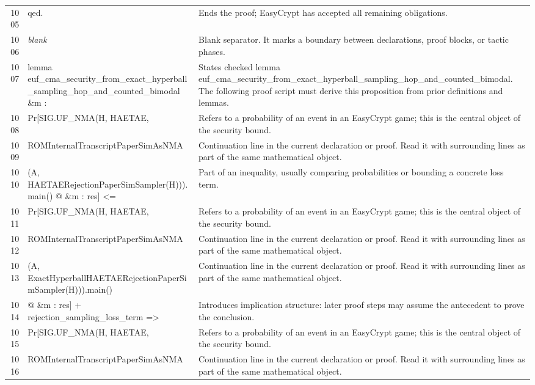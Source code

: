 \documentclass[10pt]{article}
\begin{document}
\begin{longtable}{r L{0.53\textwidth} L{0.37\textwidth}}
1005 & {\ttfamily\scriptsize qed.} & Ends the proof; EasyCrypt has accepted all remaining obligations. \\
1006 & {\ttfamily\scriptsize \emph{blank}} & Blank separator.  It marks a boundary between declarations, proof blocks, or tactic phases. \\
1007 & {\ttfamily\scriptsize lemma euf\_cma\_security\_from\_exact\_hyperball\_sampling\_hop\_and\_counted\_bimodal \&m :} & States checked lemma euf\_cma\_security\_from\_exact\_hyperball\_sampling\_hop\_and\_counted\_bimodal.  The following proof script must derive this proposition from prior definitions and lemmas. \\
1008 & {\ttfamily\scriptsize   Pr[SIG.UF\_NMA(H, HAETAE,} & Refers to a probability of an event in an EasyCrypt game; this is the central object of the security bound. \\
1009 & {\ttfamily\scriptsize        ROMInternalTranscriptPaperSimAsNMA} & Continuation line in the current declaration or proof.  Read it with surrounding lines as part of the same mathematical object. \\
1010 & {\ttfamily\scriptsize          (A, HAETAERejectionPaperSimSampler(H))).main() @ \&m : res] <=} & Part of an inequality, usually comparing probabilities or bounding a concrete loss term. \\
1011 & {\ttfamily\scriptsize   Pr[SIG.UF\_NMA(H, HAETAE,} & Refers to a probability of an event in an EasyCrypt game; this is the central object of the security bound. \\
1012 & {\ttfamily\scriptsize        ROMInternalTranscriptPaperSimAsNMA} & Continuation line in the current declaration or proof.  Read it with surrounding lines as part of the same mathematical object. \\
1013 & {\ttfamily\scriptsize          (A, ExactHyperballHAETAERejectionPaperSimSampler(H))).main()} & Continuation line in the current declaration or proof.  Read it with surrounding lines as part of the same mathematical object. \\
1014 & {\ttfamily\scriptsize        @ \&m : res] + rejection\_sampling\_loss\_term =>} & Introduces implication structure: later proof steps may assume the antecedent to prove the conclusion. \\
1015 & {\ttfamily\scriptsize   Pr[SIG.UF\_NMA(H, HAETAE,} & Refers to a probability of an event in an EasyCrypt game; this is the central object of the security bound. \\
1016 & {\ttfamily\scriptsize        ROMInternalTranscriptPaperSimAsNMA} & Continuation line in the current declaration or proof.  Read it with surrounding lines as part of the same mathematical object. \\

\end{longtable}
\end{document}

